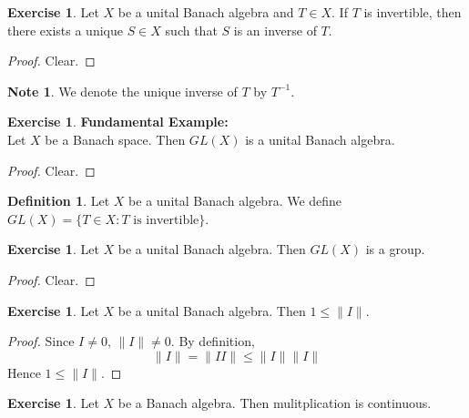 \documentclass[12pt]{amsart}
\theoremstyle{definition}
\newtheorem{defn}[definition]{Definition}
\newtheorem{note}[definition]{Note}
\newtheorem{ex}[definition]{Exercise}
\newcommand{\tbf}[1]{\textbf{#1}}
\DeclareMathOperator*{\0}{\mbf{0}}
\DeclareMathOperator*{\1}{\mbf{1}}
\newcommand{\lex}[1]{\label{ex:#1}}
\newcommand{\ld}[1]{\label{defn:#1}}
\begin{document}
		\begin{ex} \lex{}
		Let $X$ be a unital Banach algebra and $T \in X$. If $T$ is invertible, then there exists a unique $S \in X$ such that $S$ is an inverse of $T$.
		\end{ex}
		
		\begin{proof}
		Clear.
		\end{proof}
		
		\begin{note}
		We denote the unique inverse of $T$ by $T^{-1}$.
		\end{note}
		
			
	\begin{ex} \lex{}\tbf{Fundamental Example:} \\
	Let $X$ be a Banach space. Then $GL(X)$ is a unital Banach algebra.
	\end{ex}
	
	\begin{proof}
	Clear.
	\end{proof}
		
		\begin{defn} \ld{}
		Let $X$ be a unital Banach algebra. We define $GL(X) = \{T \in X: T \text{ is invertible}\}$.
		\end{defn}
		
		\begin{ex} \lex{}
		Let $X$ be a unital Banach algebra. Then $GL(X)$ is a group.  
	\end{ex}
	
	\begin{proof}
	Clear.
	\end{proof}
	
	\begin{ex} \lex{}
		Let $X$ be a unital Banach algebra. Then $1 \leq \|I \|$. 
	\end{ex}
	
	\begin{proof}
		Since $I \neq 0$, $\|I \|\neq 0$. By definition, $$\|I \|= \|I I \|\leq \|I \|\|I \|$$ Hence $1 \leq \|I \|$.
	\end{proof}
	
	\begin{ex} \lex{}
		Let $X$ be a Banach algebra. Then mulitplication is continuous. 
	\end{ex}
	
\end{document}
